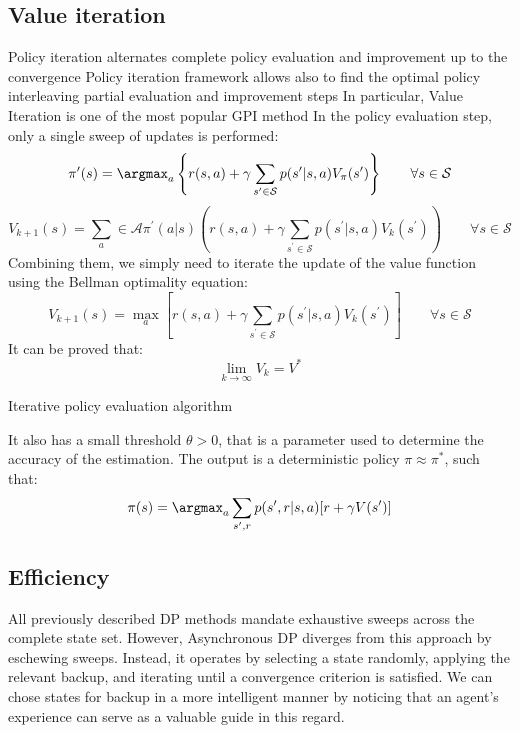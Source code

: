 \subsection{Value iteration}
Policy iteration alternates complete policy evaluation and improvement up to the
convergence
Policy iteration framework allows also to find the optimal policy interleaving partial
evaluation and improvement steps
In particular, Value Iteration is one of the most popular GPI method
In the policy evaluation step, only a single sweep of updates is performed:
\[\pi^\prime(s)=\argmax_a\left\{r(s,a)+\gamma\sum_{s^\prime\in\mathcal{S}}p(s^\prime|s,a)V_\pi(s^\prime)\right\}\qquad  \forall s \in \mathcal{S}\]
\[V_{k+1}(s)=\sum_a\in\mathcal{A}\pi^\prime(a|s)\left(r(s,a)+\gamma\sum_{s^\prime\in\mathcal{S}}p(s^\prime|s,a)V_k(s^\prime)\right)\qquad  \forall s \in \mathcal{S}\]
Combining them, we simply need to iterate the update of the value function using
the Bellman optimality equation:
\[V_{k+1}(s)=\max_a\left[r(s,a)+\gamma\sum_{s^\prime\in\mathcal{S}}p(s^\prime|s,a)V_k(s^\prime)\right]\qquad\forall s\in\mathcal{S}\]
It can be proved that: 
\[\lim_{k\rightarrow\infty}V_k=V^\ast\]
\begin{algorithm}[H]
    \caption{Iterative policy evaluation algorithm}
        \begin{algorithmic}[1]
            \Repeat 
                \EndFor
            \Until{$\Delta<\theta$}
        \end{algorithmic}
\end{algorithm}
It also has a small threshold $\theta>0$, that is a parameter used to determine the accuracy of the estimation.
The output is a deterministic policy $\pi\approx\pi^\ast$, such that: 
\[\pi(s)=\argmax_a\sum_{s^\prime,r}p(s^\prime,r|s,a)[r+\gamma V(s^\prime)]\]

\subsection{Efficiency}
All previously described DP methods mandate exhaustive sweeps across the complete state set. 
However, Asynchronous DP diverges from this approach by eschewing sweeps. 
Instead, it operates by selecting a state randomly, applying the relevant backup, and iterating until a convergence criterion is satisfied.
We can chose states for backup in a more intelligent manner by noticing that an agent's experience can serve as a valuable guide in this regard.


